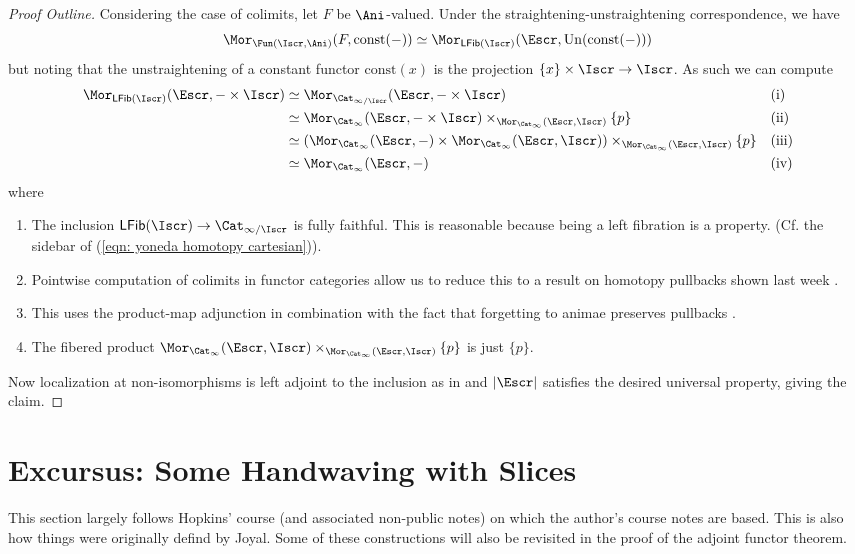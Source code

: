 \documentclass{amsart}
\theoremstyle{definition}
\numberwithin{equation}{section}
\begin{document}
\begin{proof}[Proof Outline]
  Considering the case of colimits, let $F$ be $\Ani$-valued. Under the straightening-unstraightening correspondence, we have
  $$\Mor_{\Fun(\Iscr,\Ani)}(F,\mathrm{const}(-))\simeq\Mor_{\mathsf{LFib}(\Iscr)}(\Escr,\mathrm{Un}(\mathrm{const}(-)))$$
  but noting that the unstraightening of a constant functor $\mathrm{const}(x)$ is the projection $\{x\}\times\Iscr\to\Iscr$. As such we can compute
  \begin{align*}
    \Mor_{\mathsf{LFib}(\Iscr)}(\Escr,-\times\Iscr) &\simeq \Mor_{\Cat_{\infty/\Iscr}}(\Escr,-\times\Iscr) && \text{(i)}\\
    &\simeq \Mor_{\Cat_{\infty}}(\Escr,-\times\Iscr)\times_{\Mor_{\Cat_{\infty}}(\Escr,\Iscr)}\{p\} && \text{(ii)}\\
    &\simeq \left(\Mor_{\Cat_{\infty}}(\Escr,-)\times\Mor_{\Cat_{\infty}}(\Escr,\Iscr)\right)\times_{\Mor_{\Cat_{\infty}}(\Escr,\Iscr)}\{p\} && \text{(iii)} \\
    &\simeq \Mor_{\Cat_{\infty}}(\Escr,-) && \text{(iv)}
  \end{align*}
  where
  \begin{enumerate}[label=(\roman*)]
    \item The inclusion $\mathsf{LFib}(\Iscr)\to\Cat_{\infty/\Iscr}$ is fully faithful. This is reasonable because being a left fibration is a property. (Cf. the sidebar of (\ref{eqn: yoneda homotopy cartesian})).
    \item Pointwise computation of colimits in functor categories  allow us to reduce this to a result on homotopy pullbacks shown last week \cite[Corr. 5.15]{Wagner}.
    \item This uses the product-map adjunction in combination with the fact that forgetting to animae preserves pullbacks .
    \item The fibered product $\Mor_{\Cat_{\infty}}(\Escr,\Iscr)\times_{\Mor_{\Cat_{\infty}}(\Escr,\Iscr)}\{p\}$ is just $\{p\}$.
  \end{enumerate}
  Now localization at non-isomorphisms is left adjoint to the inclusion as in  and $|\Escr|$ satisfies the desired universal property, giving the claim.
\end{proof}
\section{Excursus: Some Handwaving with Slices}\label{sec: constructions with slices and joins}
This section largely follows Hopkins' course (and associated non-public notes) \cite{Hopkins} on which the author's course notes \cite{Ong} are based. This is also how things were originally defind by Joyal. Some of these constructions will also be revisited in the proof of the adjoint functor theorem.
\end{document}

